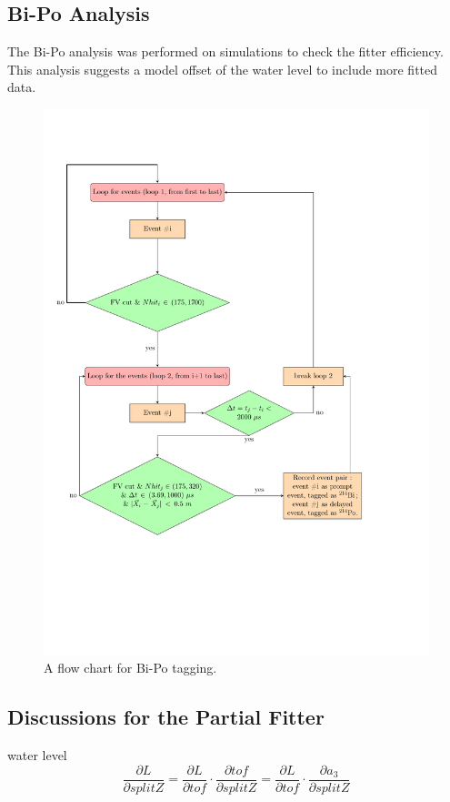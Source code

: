 \subsection{Bi-Po Analysis}
The Bi-Po analysis was performed on simulations to check the fitter efficiency. This analysis suggests a model offset of the water level to include more fitted data.
\begin{figure}[!htb]
	\centering
	\includegraphics[width=15cm]{flowchart_latex.pdf}
	\caption{A flow chart for Bi-Po tagging.}
	\label{biPo_flowchart}
\end{figure}


\subsection{Discussions for the Partial Fitter}
water level
\[
\frac{\partial L}{\partial splitZ} = \frac{\partial L}{\partial tof}\cdot\frac{\partial tof}{\partial splitZ}=\frac{\partial L}{\partial tof}\cdot\frac{\partial a_3}{\partial splitZ}
\]

